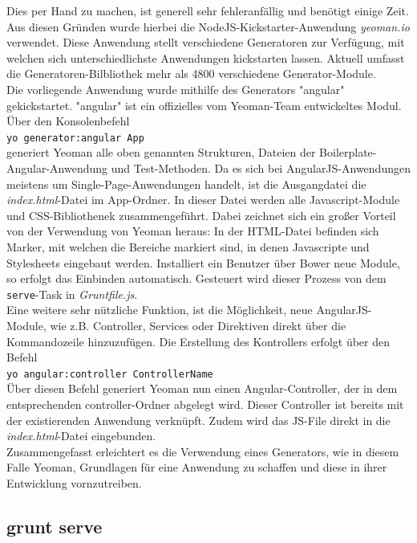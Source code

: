 Dies per Hand zu machen, ist generell sehr fehleranfällig und benötigt einige Zeit. Aus diesen Gründen wurde hierbei die NodeJS-Kickstarter-Anwendung \textit{yeoman.io} verwendet.
Diese Anwendung stellt verschiedene Generatoren zur Verfügung, mit welchen sich unterschiedlichste Anwendungen kickstarten lassen. Aktuell umfasst die Generatoren-Bilbliothek mehr als 4800 verschiedene
Generator-Module.\\
Die vorliegende Anwendung wurde mithilfe des Generators "angular" gekickstartet. "angular" ist ein offizielles vom Yeoman-Team entwickeltes Modul.
Über den Konsolenbefehl\\
\texttt{yo generator:angular App}\\
generiert Yeoman alle oben genannten Strukturen, Dateien der Boilerplate-Angular-Anwendung und Test-Methoden.
Da es sich bei AngularJS-Anwendungen meistens um Single-Page-Anwendungen handelt, ist die Ausgangdatei die \textit{index.html}-Datei im App-Ordner.
In dieser Datei werden alle Javascript-Module und CSS-Bibliothenek zusammengeführt. Dabei zeichnet sich ein großer Vorteil von der Verwendung von Yeoman heraus:
In der HTML-Datei befinden sich Marker, mit welchen die Bereiche markiert sind, in denen Javascripte und Stylesheets eingebaut werden. Installiert ein Benutzer über Bower neue Module, so erfolgt das Einbinden automatisch.
Gesteuert wird dieser Prozess von dem \texttt{serve}-Task in \textit{Gruntfile.js}.\\
Eine weitere sehr nützliche Funktion, ist die Möglichkeit, neue AngularJS-Module, wie z.B. Controller, Services oder Direktiven direkt über die Kommandozeile hinzuzufügen.
Die Erstellung des Kontrollers erfolgt über den Befehl \\
\texttt{yo angular:controller ControllerName}\\
Über diesen Befehl generiert Yeoman nun einen Angular-Controller, der in dem entsprechenden controller-Ordner abgelegt wird. Dieser Controller ist bereits mit der existierenden Anwendung
 verknüpft. Zudem wird das JS-File direkt in die \textit{index.html}-Datei eingebunden.\\
 Zusammengefasst erleichtert es die Verwendung eines Generators, wie in diesem Falle Yeoman, Grundlagen für eine Anwendung zu schaffen und diese in ihrer Entwicklung vornzutreiben.
\subsection{grunt serve}


